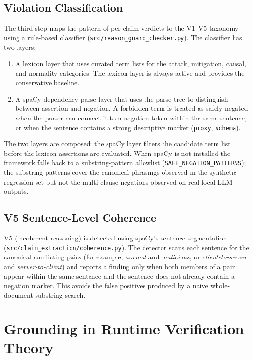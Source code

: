\subsection{Violation Classification}
\label{subsec:violation-classification}

The third step maps the pattern of per-claim verdicts to the V1--V5
taxonomy using a rule-based classifier
(\texttt{src/reason\_guard\_checker.py}). The classifier has two layers:

\begin{enumerate}
  \item A lexicon layer that uses curated term lists for the attack,
        mitigation, causal, and normality categories. The lexicon layer is
        always active and provides the conservative baseline.
  \item A spaCy dependency-parse layer that uses the parse tree to
        distinguish between assertion and negation. A forbidden term is
        treated as safely negated when the parser can connect it to a
        negation token within the same sentence, or when the sentence
        contains a strong descriptive marker (\texttt{proxy},
        \texttt{schema}).
\end{enumerate}

The two layers are composed: the spaCy layer filters the candidate term
list before the lexicon assertions are evaluated. When spaCy is not
installed the framework falls back to a substring-pattern allowlist
(\texttt{SAFE\_NEGATION\_PATTERNS}); the substring patterns cover the
canonical phrasings observed in the synthetic regression set but not the
multi-clause negations observed on real local-LLM outputs.

\subsection{V5 Sentence-Level Coherence}
\label{subsec:v5-coherence}

V5 (incoherent reasoning) is detected using spaCy's sentence segmentation
(\texttt{src/claim\_extraction/coherence.py}). The detector scans each
sentence for the canonical conflicting pairs (for example,
\emph{normal} and \emph{malicious}, or \emph{client-to-server} and
\emph{server-to-client}) and reports a finding only when both members of a
pair appear within the same sentence and the sentence does not already
contain a negation marker. This avoids the false positives produced by a
naive whole-document substring search.

\section{Grounding in Runtime Verification Theory}
\label{sec:grounding}

